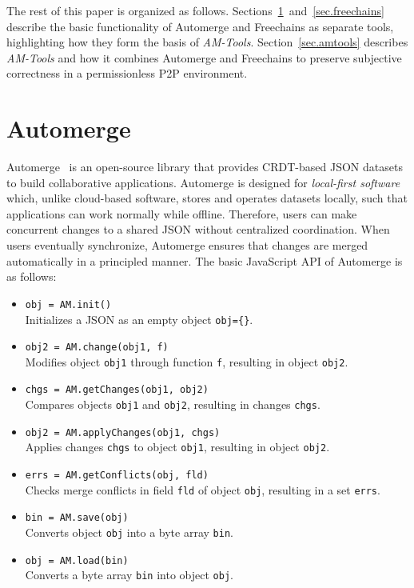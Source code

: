 \documentclass[12pt]{article}
\newcommand{\AMT}      {\emph{AM-Tools}\xspace}
\newcommand{\code}[1]  {\texttt{\footnotesize{#1}}}
\begin{document}
The rest of this paper is organized as follows.
Sections~\ref{sec.automerge}~and~\ref{sec.freechains} describe the basic
functionality of Automerge and Freechains as separate tools, highlighting how
they form the basis of \AMT.
Section~\ref{sec.amtools} describes \AMT and how it combines Automerge and
Freechains to preserve subjective correctness in a permissionless P2P
environment.

\section{Automerge}
\label{sec.automerge}

Automerge~\cite{p2p.automerge} is an open-source library that provides
CRDT-based JSON datasets to build collaborative applications.
%
Automerge is designed for \emph{local-first software}~\cite{p2p.local} which,
unlike cloud-based software, stores and operates datasets locally, such that
applications can work normally while offline.
%
Therefore, users can make concurrent changes to a shared JSON without
centralized coordination.
When users eventually synchronize, Automerge ensures that changes are merged
automatically in a principled manner.
%
%
%
The basic JavaScript API of Automerge is as follows:

\begin{itemize}
\item \code{obj = AM.init()} \\
    Initializes a JSON as an empty object \code{obj=\{\}}.
\item \code{obj2 = AM.change(obj1, f)} \\
    Modifies object \code{obj1} through function \code{f}, resulting in
    object \code{obj2}.
\item \code{chgs = AM.getChanges(obj1, obj2)} \\
    Compares objects \code{obj1} and \code{obj2}, resulting in changes
    \code{chgs}.
\item \code{obj2 = AM.applyChanges(obj1, chgs)} \\
    Applies changes \code{chgs} to object \code{obj1}, resulting in object
    \code{obj2}.
\item \code{errs = AM.getConflicts(obj, fld)} \\
    Checks merge conflicts in field \code{fld} of object \code{obj}, resulting
    in a set \code{errs}.
\item \code{bin = AM.save(obj)} \\
    Converts object \code{obj} into a byte array \code{bin}.
\item \code{obj = AM.load(bin)} \\
    Converts a byte array \code{bin} into object \code{obj}.
\end{itemize}
\end{document}
